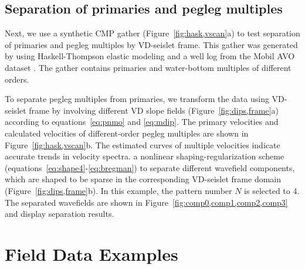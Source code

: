 
\subsection{Separation of primaries and pegleg multiples}
Next, we use a synthetic CMP gather (Figure~\ref{fig:hask,vscan}a) to
test separation of primaries and pegleg multiples by VD-seislet
frame. This gather was generated by \cite{Lumley94} using
Haskell-Thompson elastic modeling and a well log from the Mobil AVO
dataset \cite[]{key}. The gather contains primaries and water-bottom
multiples of different orders.

To separate pegleg multiples from primaries, we transform the
data using VD-seislet frame by involving different VD slope fields
(Figure~\ref{fig:dips,frame}a) according to equations~\ref{eq:pnmo}
and
\ref{eq:mdip}. The primary velocities and calculated velocities of
different-order pegleg multiples are shown in
Figure~\ref{fig:hask,vscan}b. The estimated curves of multiple
velocities indicate accurate trends in velocity spectra.   a nonlinear shaping-regularization scheme
(equations~\ref{eq:shape4}-\ref{eq:bregman}) to separate different
wavefield components, which are shaped to be sparse in the
corresponding VD-seislet frame domain
(Figure~\ref{fig:dips,frame}b). In this example, the pattern number 
$N$ is selected to  4. The
separated wavefields are shown in
Figure~\ref{fig:comp0,comp1,comp2,comp3} and display  
separation results.


 \section{Field Data Examples}

